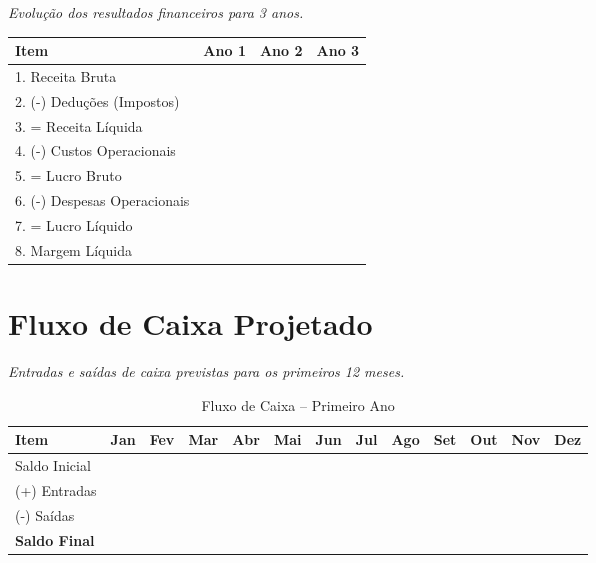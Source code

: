 \documentclass[
	12pt,
	openright,
	oneside,
	a4paper,
	chapter=TITLE,
	section=TITLE,
	english,
	brazil
	]{abntex2}
\newcommand{\tcampo}[1]{%
	{#1}%
}
\newcommand{\instrucao}[1]{%
	\vspace{0.3cm}%
	\noindent%
	{%
		\setlength{\fboxsep}{6pt}%
		\colorbox{azul-claro}{%
			\begin{minipage}{\dimexpr\textwidth-2\fboxsep\relax}%
				\setlength{\parindent}{1.25cm}%
				{\color{cinza-instrucao}\small\itshape #1}%
			\end{minipage}%
		}%
	}%
	\vspace{0.3cm}%
}
\begin{document}
\instrucao{Evolução dos resultados financeiros para 3 anos.}

\centering
\begin{tabularx}{\textwidth}{X r r r}
\toprule
\rowcolor{azul-claro}
\textbf{Item} & \textbf{Ano 1} & \textbf{Ano 2} & \textbf{Ano 3} \\
\midrule
1. Receita Bruta                    & \tcampo{} & \tcampo{} & \tcampo{} \\
2. (-{}) Deduções (Impostos)        & \tcampo{} & \tcampo{} & \tcampo{} \\
\midrule
3. = Receita Líquida               & \tcampo{} & \tcampo{} & \tcampo{} \\
4. (-{}) Custos Operacionais        & \tcampo{} & \tcampo{} & \tcampo{} \\
\midrule
5. = Lucro Bruto                   & \tcampo{} & \tcampo{} & \tcampo{} \\
6. (-{}) Despesas Operacionais      & \tcampo{} & \tcampo{} & \tcampo{} \\
\midrule
7. = Lucro Líquido                 & \tcampo{} & \tcampo{} & \tcampo{} \\
8. Margem Líquida                  & \tcampo{} & \tcampo{} & \tcampo{} \\
\bottomrule
\end{tabularx}
\label{tab:dre-projetado}

\section{Fluxo de Caixa Projetado}

\instrucao{Entradas e saídas de caixa previstas para os primeiros 12 meses.}

\begin{table}[htbp]
\caption{Fluxo de Caixa -- Primeiro Ano}
\label{tab:fluxo-caixa}
\footnotesize
\begin{tabularx}{\textwidth}{X *{12}{c}}
\toprule
\rowcolor{azul-claro}
\textbf{Item} & \textbf{Jan} & \textbf{Fev} & \textbf{Mar} & \textbf{Abr} & \textbf{Mai} & \textbf{Jun} & \textbf{Jul} & \textbf{Ago} & \textbf{Set} & \textbf{Out} & \textbf{Nov} & \textbf{Dez} \\
\midrule
Saldo Inicial  & & & & & & & & & & & & \\
(+) Entradas   & & & & & & & & & & & & \\
(-) Saídas     & & & & & & & & & & & & \\
\midrule
\textbf{Saldo Final} & & & & & & & & & & & & \\
\bottomrule
\end{tabularx}
\end{table}
\end{document}
